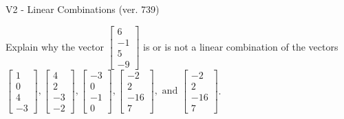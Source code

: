 \begin{exercise}
  \begin{exerciseTitle}V2 - Linear Combinations (ver. 739)\end{exerciseTitle}
  \begin{exerciseStatement}
    Explain why the vector \(\left[\begin{array}{c}
6 \\
-1 \\
5 \\
-9
\end{array}\right]\)  is or is not a linear 
	combination of the vectors \(\left[\begin{array}{c}
1 \\
0 \\
4 \\
-3
\end{array}\right] , \left[\begin{array}{c}
4 \\
2 \\
-3 \\
-2
\end{array}\right] , \left[\begin{array}{c}
-3 \\
0 \\
-1 \\
0
\end{array}\right] , \left[\begin{array}{c}
-2 \\
2 \\
-16 \\
7
\end{array}\right] , \text{ and } \left[\begin{array}{c}
-2 \\
2 \\
-16 \\
7
\end{array}\right]\).
	



\end{exerciseStatement}
\end{exercise}
